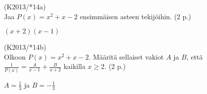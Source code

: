\begin{tehtava}
(K2013/*14a) \\ Jaa $P(x)=x^2+x-2$ ensimmäisen asteen tekijöihin. (2 p.)
\begin{vastaus}
$(x+2)(x-1)$
\end{vastaus}
\end{tehtava}

\begin{tehtava}
(K2013/*14b) \\ Olkoon $P(x)=x^2+x-2$. Määritä sellaiset vakiot $A$ ja $B$, että $\frac{1}{P(x)}=\frac{A}{x-1}+\frac{B}{x+2} $ kaikilla $x \geq 2$. (2 p.)
\begin{vastaus}
$A= \frac{1}{3}$ ja $B=- \frac{1}{3}$
\end{vastaus}
\end{tehtava}



  

